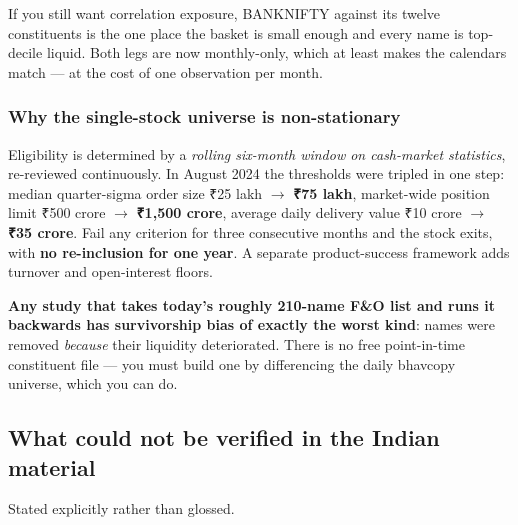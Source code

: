 \documentclass[11pt,a4paper]{article}
\newcommand{\rs}{₹}
\begin{document}
If you still want correlation exposure, BANKNIFTY against its twelve constituents
is the one place the basket is small enough and every name is top-decile liquid.
Both legs are now monthly-only, which at least makes the calendars match --- at the
cost of one observation per month.

\subsubsection{Why the single-stock universe is non-stationary}
\label{sec:eligibility}

Eligibility is determined by a \emph{rolling six-month window on cash-market
statistics}, re-reviewed continuously. In August 2024 the thresholds were tripled
in one step: median quarter-sigma order size \rs 25 lakh $\to$ \textbf{\rs 75
lakh}, market-wide position limit \rs 500 crore $\to$ \textbf{\rs 1{,}500 crore},
average daily delivery value \rs 10 crore $\to$ \textbf{\rs 35 crore}. Fail any
criterion for three consecutive months and the stock exits, with \textbf{no
re-inclusion for one year}. A separate product-success framework adds turnover and
open-interest floors.

\textbf{Any study that takes today's roughly 210-name F\&O list and runs it
backwards has survivorship bias of exactly the worst kind}: names were removed
\emph{because} their liquidity deteriorated. There is no free point-in-time
constituent file --- you must build one by differencing the daily bhavcopy
universe, which you can do.

\subsection{What could not be verified in the Indian material}

Stated explicitly rather than glossed.
\end{document}

